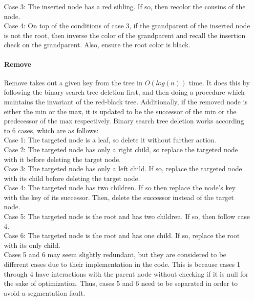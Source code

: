 \documentclass{article}
\begin{document}
\noindent
Case 3: The inserted node has a red sibling. If so, then recolor the cousins of the node.
\\

\noindent
Case 4: On top of the conditions of case 3, if the grandparent of the inserted node is not the root, then inverse the color of the grandparent and recall the insertion check on the grandparent. Also, ensure the root color is black.
\\

\paragraph{Remove}

\noindent
Remove takes out a given key from the tree in $O(log(n))$ time. It does this by following the binary search tree deletion first, and then doing a procedure which maintains the invariant of the red-black tree. Additionally, if the removed node is either the min or the max, it is updated to be the successor of the min or the predecessor of the max respectively. Binary search tree deletion works according to 6 cases, which are as follows:
\\

\noindent
Case 1: The targeted node is a leaf, so delete it without further action.
\\

\noindent
Case 2: The targeted node has only a right child, so replace the targeted node with it before deleting the target node.
\\

\noindent
Case 3: The targeted node has only a left child. If so, replace the targeted node with its child before deleting the target node.
\\

\noindent
Case 4: The targeted node has two children. If so then replace the node’s key with the key of its successor. Then, delete the successor instead of the target node.
\\

\noindent
Case 5: The targeted node is the root and has two children. If so, then follow case 4.
\\

\noindent
Case 6: The targeted node is the root and has one child. If so, replace the root with its only child.
\\

\noindent
Cases 5 and 6 may seem slightly redundant, but they are considered to be different cases due to their implementation in the code. This is because cases 1 through 4 have interactions with the parent node without checking if it is null for the sake of optimization. Thus, cases 5 and 6 need to be separated in order to avoid a segmentation fault.
\\
\end{document}
